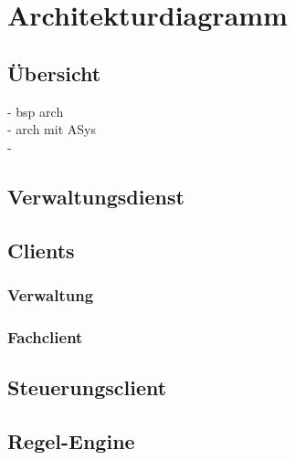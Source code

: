 \chapter{Architekturdiagramm}

\begin{comment}
Im Architekturdiagramm muss ersichtlich sein welche Softwareschichten/Softwarekomponenten es im System gibt und über welche Kommunikationsprinzipen und Protokolle diese miteinander kommunizieren. Es muss aufgezeigt werden wie die ausgetauschten Informationen repräsentiert werden. Des Weiteren spielt die Verteiltheit der Anwendungslogik eine große Rolle. 

Es muss nachvollziehbar sein inwiefern eine Verteiltheit der Anwendungslogik gegeben ist. 

Sämtliche Entscheidungen müssen begründet und abgewogen werden. Formal gesehen sollten einfache geometrische Primitive verwenden werden. (Orientierung an der Fachliteratur) 
\end{comment}


\section{Übersicht}
- bsp arch\\
- arch mit ASys\\
- 

\section{Verwaltungsdienst}

\section{Clients}

\subsection{Verwaltung}
\subsection{Fachclient}

\section{Steuerungsclient}


\section{Regel-Engine}




